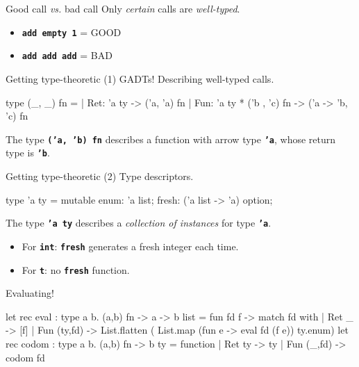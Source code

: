 \documentclass[final,xetex]{beamer}
\newcommand{\red}[1]{{\color{orange2}#1}}
\newcommand{\green}[1]{{\color{chameleon3}#1}}
\newcommand{\code}[1]{\texttt{\textbf{#1}}}
\begin{document}
\begin{frame}{Good call \emph{vs.} bad call}
  Only \emph{certain} calls are \emph{well-typed}.

  \begin{itemize}
    \item \code{add empty 1} = \green{GOOD}
    \item \code{add add add} = \red{BAD}
  \end{itemize}
\end{frame}

\begin{frame}[fragile]{Getting type-theoretic (1)}
  GADTs! Describing well-typed calls.

\bigskip

\begin{ocamlcode}
  type (_, _) fn =
  | Ret: 'a ty -> ('a, 'a) fn
  | Fun: 'a ty * ('b , 'c) fn -> ('a -> 'b, 'c) fn
\end{ocamlcode}

\bigskip

The type \code{('a, 'b) fn} describes a function with arrow type \code{'a},
whose return type is \code{'b}.

\end{frame}

\begin{frame}[fragile]{Getting type-theoretic (2)}
  Type descriptors.

  \bigskip

  \begin{ocamlcode}
type 'a ty = {
  mutable enum: 'a list;
  fresh: ('a list -> 'a) option;
}
  \end{ocamlcode}

  \bigskip

  The type \code{'a ty} describes a \emph{collection of instances} for type
  \code{'a}.

  \bigskip

  \begin{itemize}
    \item For \code{int}: \code{fresh} generates a fresh integer each time.
    \item For \code{t}: no \code{fresh} function.
  \end{itemize}
\end{frame}

\begin{frame}[fragile]{Evaluating!}
\begin{ocamlcode}
let rec eval : type a b. (a,b) fn -> a -> b list =
  fun fd f ->
    match fd with
    | Ret _ -> [f]
    | Fun (ty,fd) -> List.flatten (
        List.map (fun e -> eval fd (f e)) ty.enum)
let rec codom : type a b. (a,b) fn -> b ty =
  function
    | Ret ty -> ty
    | Fun (_,fd) -> codom fd
\end{ocamlcode}
\end{frame}
\end{document}
